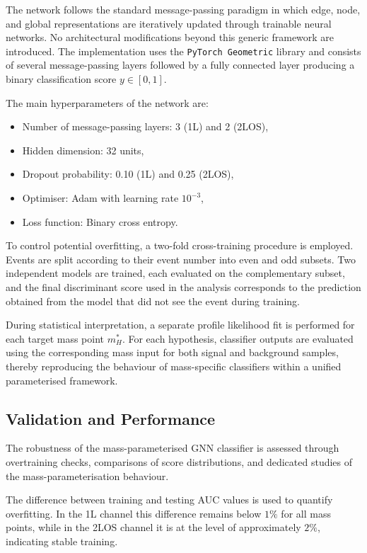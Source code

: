 The network follows the standard message-passing paradigm in which edge, node, and global representations are iteratively updated through trainable neural networks. 
No architectural modifications beyond this generic framework are introduced. 
The implementation uses the \texttt{PyTorch Geometric} library and consists of several message-passing layers followed by a fully connected layer producing a binary classification score $y \in [0,1]$.

The main hyperparameters of the network are:
\begin{itemize}
    \item Number of message-passing layers: 3 (1L) and 2 (2LOS),
    \item Hidden dimension: 32 units,
    \item Dropout probability: 0.10 (1L) and 0.25 (2LOS),
    \item Optimiser: Adam with learning rate $10^{-3}$,
    \item Loss function: Binary cross entropy.
\end{itemize}

To control potential overfitting, a two-fold cross-training procedure is employed. 
Events are split according to their event number into even and odd subsets. 
Two independent models are trained, each evaluated on the complementary subset, and the final discriminant score used in the analysis corresponds to the prediction obtained from the model that did not see the event during training.

During statistical interpretation, a separate profile likelihood fit is performed for each target mass point $m_H^\ast$. 
For each hypothesis, classifier outputs are evaluated using the corresponding mass input for both signal and background samples, thereby reproducing the behaviour of mass-specific classifiers within a unified parameterised framework.

\subsection{Validation and Performance}

The robustness of the mass-parameterised GNN classifier is assessed through overtraining checks, comparisons of score distributions, and dedicated studies of the mass-parameterisation behaviour.

The difference between training and testing AUC values is used to quantify overfitting. 
In the 1L channel this difference remains below $1\%$ for all mass points, while in the 2LOS channel it is at the level of approximately $2\%$, indicating stable training.

